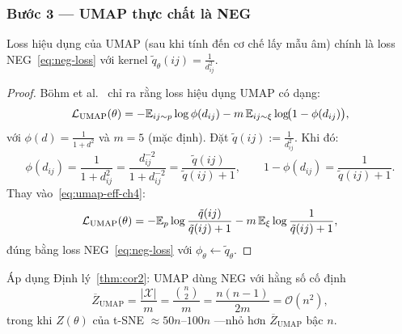 \begin{center}
\end{center}

\subsubsection{Bước 3 --- UMAP thực chất là NEG}
\label{sec:umap-is-neg}

\begin{lemma}[Bổ đề 3 --- Damrich et al., 2023]
\label{lem:umap-neg}
Loss hiệu dụng của UMAP (sau khi tính đến cơ chế lấy mẫu âm) chính là loss NEG~\eqref{eq:neg-loss} với kernel $\tilde{q}_\theta(ij) = \frac{1}{d_{ij}^2}$.
\end{lemma}

\begin{proof}
Böhm et al.~\cite{bohm2022attraction} chỉ ra rằng loss hiệu dụng UMAP có dạng:
\begin{equation}
  \mathcal{L}_{\text{UMAP}}(\theta)
  = -\mathbb{E}_{ij \sim p}\log\phi(d_{ij})
  - m\,\mathbb{E}_{ij \sim \xi}\log\!\bigl(1 - \phi(d_{ij})\bigr),
  \label{eq:umap-eff-ch4}
\end{equation}
với $\phi(d) = \frac{1}{1+d^2}$ và $m = 5$ (mặc định). Đặt $\tilde{q}(ij) := \frac{1}{d_{ij}^2}$. Khi đó:
\begin{equation}
  \phi(d_{ij})
  = \frac{1}{1+d_{ij}^2}
  = \frac{d_{ij}^{-2}}{1+d_{ij}^{-2}}
  = \frac{\tilde{q}(ij)}{\tilde{q}(ij)+1}, \qquad
  1-\phi(d_{ij}) = \frac{1}{\tilde{q}(ij)+1}.
  \label{eq:umap-neg-equiv}
\end{equation}
Thay vào~\eqref{eq:umap-eff-ch4}:
\[
  \mathcal{L}_{\text{UMAP}}(\theta)
  = -\mathbb{E}_{p}\log\frac{\tilde{q}(ij)}{\tilde{q}(ij)+1}
  - m\,\mathbb{E}_{\xi}\log\frac{1}{\tilde{q}(ij)+1},
\]
đúng bằng loss NEG~\eqref{eq:neg-loss} với $\phi_\theta \leftarrow \tilde{q}_\theta$.
\end{proof}

Áp dụng Định lý~\ref{thm:cor2}: UMAP dùng NEG với hằng số cố định
\begin{equation}
  \overline{Z}_{\text{UMAP}} = \frac{|\mathcal{X}|}{m} = \dfrac{\binom{n}{2}}{m}
  = \frac{n(n-1)}{2m} = \mathcal{O}(n^2),
  \label{eq:z-umap}
\end{equation}
trong khi $Z(\theta)$ của t-SNE $\approx 50n$--$100n$ \cite{bohm2022attraction}---nhỏ hơn $\overline{Z}_{\text{UMAP}}$ bậc $n$.

